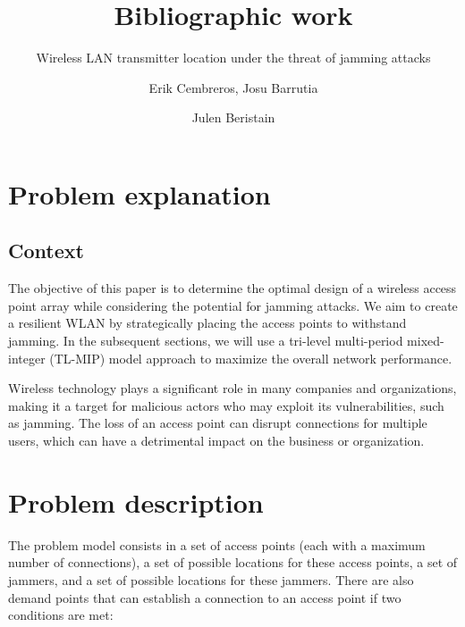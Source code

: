 \documentclass[runningheads]{llncs}
\begin{document}
	\title{Bibliographic work}
    \subtitle{Wireless LAN transmitter location under the threat of jamming attacks}
	\author{Erik Cembreros,
		Josu Barrutia \and
		Julen Beristain}
	\maketitle              %

\section{Problem explanation}
\subsection{Context}

 The objective of this paper\textsuperscript{\cite{ref_article}} is to determine the optimal design of a wireless access point array while considering the potential for jamming attacks. We aim to create a resilient WLAN by strategically placing the access points to withstand jamming. In the subsequent sections, we will use a tri-level multi-period mixed-integer (TL-MIP) model approach to maximize the overall network performance.
 
Wireless technology plays a significant role in many companies and organizations, making it a target for malicious actors who may exploit its vulnerabilities, such as jamming. The loss of an access point can disrupt connections for multiple users, which can have a detrimental impact on the business or organization.

\section{Problem description}

The problem model consists in a set of access points (each with a maximum number of connections), a set of possible locations for these access points, a set of jammers, and a set of possible locations for these jammers.
There are also demand points that can establish a connection to an access point if two conditions are met:
\end{document}
